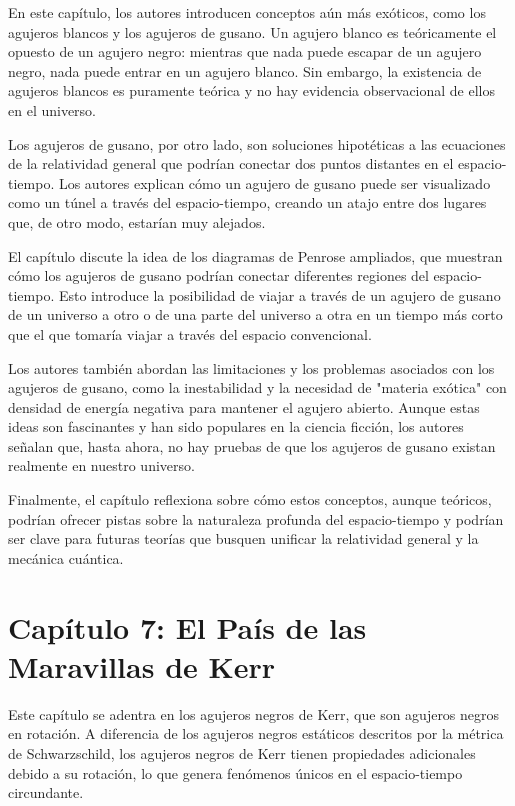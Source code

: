 \documentclass{article}
\begin{document}
En este capítulo, los autores introducen conceptos aún más exóticos, como los agujeros blancos y los agujeros de gusano. Un agujero blanco es teóricamente el opuesto de un agujero negro: mientras que nada puede escapar de un agujero negro, nada puede entrar en un agujero blanco. Sin embargo, la existencia de agujeros blancos es puramente teórica y no hay evidencia observacional de ellos en el universo.

Los agujeros de gusano, por otro lado, son soluciones hipotéticas a las ecuaciones de la relatividad general que podrían conectar dos puntos distantes en el espacio-tiempo. Los autores explican cómo un agujero de gusano puede ser visualizado como un túnel a través del espacio-tiempo, creando un atajo entre dos lugares que, de otro modo, estarían muy alejados.

El capítulo discute la idea de los diagramas de Penrose ampliados, que muestran cómo los agujeros de gusano podrían conectar diferentes regiones del espacio-tiempo. Esto introduce la posibilidad de viajar a través de un agujero de gusano de un universo a otro o de una parte del universo a otra en un tiempo más corto que el que tomaría viajar a través del espacio convencional.

Los autores también abordan las limitaciones y los problemas asociados con los agujeros de gusano, como la inestabilidad y la necesidad de "materia exótica" con densidad de energía negativa para mantener el agujero abierto. Aunque estas ideas son fascinantes y han sido populares en la ciencia ficción, los autores señalan que, hasta ahora, no hay pruebas de que los agujeros de gusano existan realmente en nuestro universo.

Finalmente, el capítulo reflexiona sobre cómo estos conceptos, aunque teóricos, podrían ofrecer pistas sobre la naturaleza profunda del espacio-tiempo y podrían ser clave para futuras teorías que busquen unificar la relatividad general y la mecánica cuántica.

\section*{Capítulo 7: El País de las Maravillas de Kerr}

Este capítulo se adentra en los agujeros negros de Kerr, que son agujeros negros en rotación. A diferencia de los agujeros negros estáticos descritos por la métrica de Schwarzschild, los agujeros negros de Kerr tienen propiedades adicionales debido a su rotación, lo que genera fenómenos únicos en el espacio-tiempo circundante.
\end{document}
